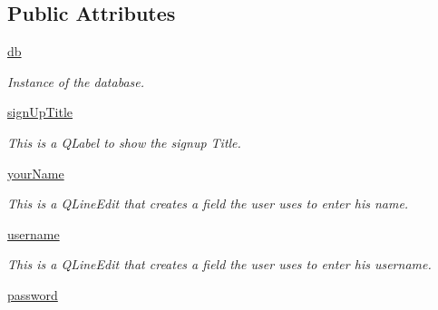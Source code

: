 \subsection*{Public Attributes}
\begin{DoxyCompactItemize}
\item 
\hyperlink{classsrc_1_1login__menu_1_1_login_menu_a9a3d5cb39385fb4b3d10f46af5543205}{db}
\begin{DoxyCompactList}\small\item\em Instance of the database. \end{DoxyCompactList}\item 
\hyperlink{classsrc_1_1login__menu_1_1_login_menu_a07a65e6211f15b49d6e6abc0daac320b}{sign\+Up\+Title}
\begin{DoxyCompactList}\small\item\em This is a Q\+Label to show the signup Title. \end{DoxyCompactList}\item 
\hyperlink{classsrc_1_1login__menu_1_1_login_menu_a6ba84d7d5a18940588ad710b7f6f964c}{your\+Name}
\begin{DoxyCompactList}\small\item\em This is a Q\+Line\+Edit that creates a field the user uses to enter his name. \end{DoxyCompactList}\item 
\hyperlink{classsrc_1_1login__menu_1_1_login_menu_a6b5acd3b5dd7c538b601cf8ab1b1d4cf}{username}
\begin{DoxyCompactList}\small\item\em This is a Q\+Line\+Edit that creates a field the user uses to enter his username. \end{DoxyCompactList}\item 
\hypertarget{classsrc_1_1login__menu_1_1_login_menu_a036845330836e34588c87e2d73f53b85}{}\hyperlink{classsrc_1_1login__menu_1_1_login_menu_a036845330836e34588c87e2d73f53b85}{password}\label{classsrc_1_1login__menu_1_1_login_menu_a036845330836e34588c87e2d73f53b85}


\end{DoxyCompactItemize}
